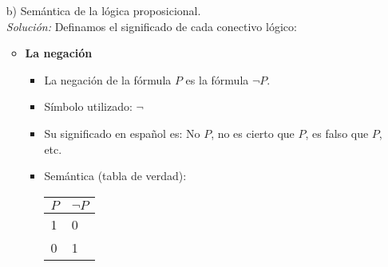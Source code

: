 \documentclass[letterpaper,11pt]{article}
\begin{document}
\begin{enumerate}
\begin{itemize}
            \item[b)] Semántica de la lógica proposicional. \\ 
            \textit{Solución:} Definamos el significado de cada conectivo 
            lógico:

            \begin{itemize}
                \item \textbf{La negación}
    
                \begin{itemize}
                    \item La negación de la fórmula $P$ es la fórmula 
                    $\neg P$.
                    \item Símbolo utilizado: $\neg$
                    \item Su significado en español es: No $P$, no es cierto
                    que $P$, es falso que $P$, etc.
                    \item Semántica (tabla de verdad):
                    \begin{table}[htbp]
                        \begin{center}
                        \begin{tabular}{|l|l|}
                        \hline
                        $P$ & $\neg P$ \\
                        \hline \hline
                        1 & 0 \\ \hline
                        0 & 1 \\ \hline
                        \end{tabular}
                        \end{center}
                    \end{table}
                \end{itemize}


\end{itemize}
\end{itemize}
\end{enumerate}
\end{document}
